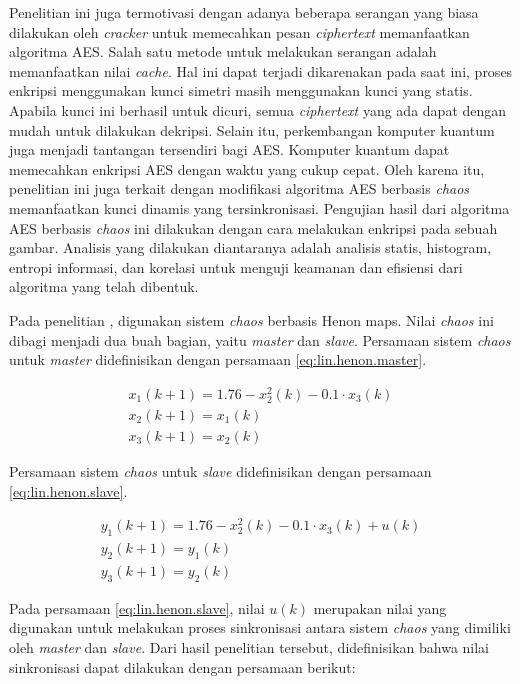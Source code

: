 Penelitian ini juga termotivasi dengan adanya beberapa serangan yang biasa dilakukan oleh \emph{cracker} untuk memecahkan pesan \emph{ciphertext} memanfaatkan algoritma AES. Salah satu metode untuk melakukan serangan adalah memanfaatkan nilai \emph{cache}. Hal ini dapat terjadi dikarenakan pada saat ini, proses enkripsi menggunakan kunci simetri masih menggunakan kunci yang statis. Apabila kunci ini berhasil untuk dicuri, semua \emph{ciphertext} yang ada dapat dengan mudah untuk dilakukan dekripsi. Selain itu, perkembangan komputer kuantum juga menjadi tantangan tersendiri bagi AES. Komputer kuantum dapat memecahkan enkripsi AES dengan waktu yang cukup cepat. Oleh karena itu, penelitian ini juga terkait dengan modifikasi algoritma AES berbasis \emph{chaos} memanfaatkan kunci dinamis yang tersinkronisasi. Pengujian hasil dari algoritma AES berbasis \emph{chaos} ini dilakukan dengan cara melakukan enkripsi pada sebuah gambar. Analisis yang dilakukan diantaranya adalah analisis statis, histogram, entropi informasi, dan korelasi untuk menguji keamanan dan efisiensi dari algoritma yang telah dibentuk.

Pada penelitian \textcite{lin2021}, digunakan sistem \emph{chaos} berbasis Henon maps. Nilai \emph{chaos} ini dibagi menjadi dua buah bagian, yaitu \emph{master} dan \emph{slave}. Persamaan sistem \emph{chaos} untuk \emph{master} didefinisikan dengan persamaan \ref{eq:lin.henon.master}.

\begin{equation}
  \label{eq:lin.henon.master}
  \begin{array}{l}   
    x_1(k+1) = 1.76 - x_2^2(k) - 0.1 \cdot x_3(k)\\
    x_2(k+1) = x_1(k)\\
    x_3(k+1) = x_2(k)
  \end{array}
\end{equation}

Persamaan sistem \emph{chaos} untuk \emph{slave} didefinisikan dengan persamaan \ref{eq:lin.henon.slave}.

\begin{equation}
  \label{eq:lin.henon.slave}
  \begin{array}{l}   
    y_1(k+1) = 1.76 - x_2^2(k) - 0.1 \cdot x_3(k) + u(k)\\
    y_2(k+1) = y_1(k)\\
    y_3(k+1) = y_2(k)
  \end{array}
\end{equation}

Pada persamaan \ref{eq:lin.henon.slave}, nilai $u(k)$ merupakan nilai yang digunakan untuk melakukan proses sinkronisasi antara sistem \emph{chaos} yang dimiliki oleh \emph{master} dan \emph{slave}. Dari hasil penelitian tersebut, didefinisikan bahwa nilai sinkronisasi dapat dilakukan dengan persamaan berikut:

